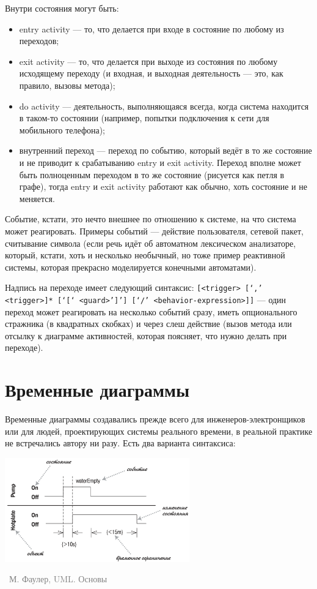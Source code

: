 \documentclass[a5paper]{article}
\newcommand{\attribution}[1] {
    \vspace{-5mm}\begin{flushright}\begin{scriptsize}\textcolor{gray}{\textcopyright\, #1}\end{scriptsize}\end{flushright}
}
\begin{document}
Внутри состояния могут быть:

\begin{itemize}
    \item entry activity --- то, что делается при входе в состояние по любому из переходов;
    \item exit activity --- то, что делается при выходе из состояния по любому исходящему переходу (и входная, и выходная деятельность --- это, как правило, вызовы метода);
    \item do activity --- деятельность, выполняющаяся всегда, когда система находится в таком-то состоянии (например, попытки подключения к сети для мобильного телефона);
    \item внутренний переход --- переход по событию, который ведёт в то же состояние и не приводит к срабатыванию entry и exit activity. Переход вполне может быть полноценным переходом в то же состояние (рисуется как петля в графе), тогда entry и exit activity работают как обычно, хоть состояние и не меняется.
\end{itemize}

Событие, кстати, это нечто внешнее по отношению к системе, на что система может реагировать. Примеры событий --- действие пользователя, сетевой пакет, считывание символа (если речь идёт об автоматном лексическом анализаторе, который, кстати, хоть и несколько необычный, но тоже пример реактивной системы, которая прекрасно моделируется конечными автоматами).

Надпись на переходе имеет следующий синтаксис: \verb|[<trigger> [‘,’ <trigger>]* [‘[‘ <guard>’]’] [‘/’ <behavior-expression>]]| --- один переход может реагировать на несколько событий сразу, иметь опционального стражника (в квадратных скобках) и через слеш действие (вызов метода или отсылку к диаграмме активностей, которая поясняет, что нужно делать при переходе).

\section{Временные диаграммы}

Временные диаграммы создавались прежде всего для инженеров-электронщиков или для людей, проектирующих системы реального времени, в реальной практике не встречались автору ни разу. Есть два варианта синтаксиса:

\begin{center}
    \includegraphics[width=0.6\textwidth]{timingDiagrams.png}
    \attribution{М. Фаулер, UML. Основы}
\end{center}
\end{document}
